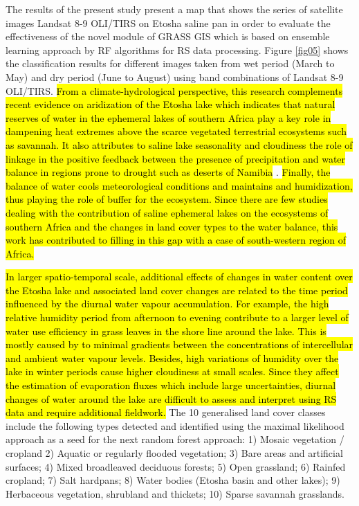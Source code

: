 \documentclass[climate,article,submit,pdftex,moreauthors]{Definitions/mdpi}
\begin{document}
The results of the present study present a map that shows the series of satellite images Landsat 8-9 OLI/TIRS on Etosha saline pan in order to evaluate the effectiveness of the novel module of GRASS GIS which is based on ensemble learning approach by RF algorithms for RS data processing. Figure \ref{fig05} shows the classification results for different images taken from wet period (March to May) and dry period (June to August) using band combinations of Landsat 8-9 OLI/TIRS. \hl{From a climate-hydrological perspective, this research complements recent evidence on aridization of the Etosha lake which indicates that natural reserves of water in the ephemeral lakes of southern Africa play a key role in dampening heat extremes above the scarce vegetated terrestrial ecosystems such as savannah. It also attributes to saline lake seasonality and cloudiness the role of linkage in the positive feedback between the presence of precipitation and water balance in regions prone to drought such as deserts of Namibia} \cite{MORETTI202235588,WENBORN2025105309}. \hl{Finally, the balance of water cools meteorological conditions and maintains and humidization, thus playing the role of buffer for the ecosystem. Since there are few studies dealing with the contribution of saline ephemeral lakes on the ecosystems of southern Africa and the changes in land cover types to the water balance, this work has contributed to filling in this gap with a case of south-western region of Africa.}

 \hl{In larger spatio-temporal scale, additional effects of changes in water content over the Etosha lake and associated land cover changes are related to the time period influenced by the diurnal water vapour accumulation. For example, the high relative humidity period from afternoon to evening contribute to a larger level of water use efficiency in grass leaves in the shore line around the lake. This is mostly caused by to minimal gradients between the concentrations of intercellular and ambient water vapour levels. Besides, high variations of humidity over the lake in winter periods cause higher cloudiness at small scales. Since they affect the estimation of evaporation fluxes which include large uncertainties, diurnal changes of water around the lake are difficult to assess and interpret using RS data and require additional fieldwork.} The 10 generalised land cover classes include the following types detected and identified using the maximal likelihood approach as a seed for the next random forest approach: 1) Mosaic vegetation / cropland 2) Aquatic or regularly flooded vegetation; 3) Bare areas and artificial surfaces; 4) Mixed broadleaved deciduous forests; 5) Open grassland; 6) Rainfed cropland; 7) Salt hardpans; 8) Water bodies (Etosha basin and other lakes); 9) Herbaceous vegetation, shrubland and thickets; 10) Sparse savannah grasslands.
\end{document}
